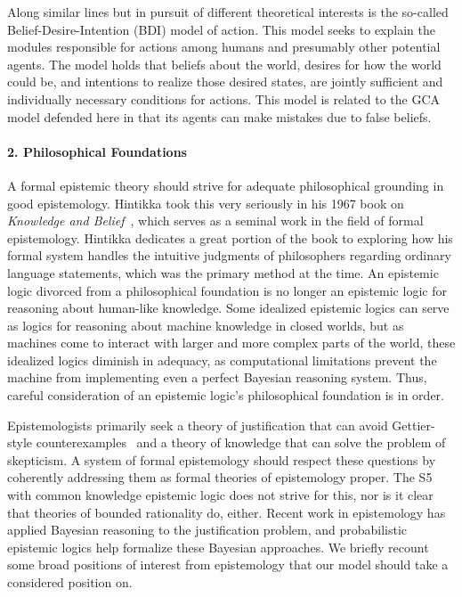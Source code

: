 Along similar lines but in pursuit of different theoretical interests is the so-called Belief-Desire-Intention (BDI) model of action. This model seeks to explain the modules responsible for actions among humans and presumably other potential agents. The model holds that beliefs about the world, desires for how the world could be, and intentions to realize those desired states, are jointly sufficient and individually necessary conditions for actions. This model is related to the GCA model defended here in that its agents can make mistakes due to false beliefs. 

\paragraph{2. Philosophical Foundations}
A formal epistemic theory should strive for adequate philosophical grounding in good epistemology. Hintikka took this very seriously in his 1967 book on \emph{Knowledge and Belief}~\cite{Hintikka}, which serves as a seminal work in the field of formal epistemology. Hintikka dedicates a great portion of the book to exploring how his formal system handles the intuitive judgments of philosophers regarding ordinary language statements, which was the primary method at the time. An epistemic logic divorced from a philosophical foundation is no longer an epistemic logic for reasoning about human-like knowledge. Some idealized epistemic logics can serve as logics for reasoning about machine knowledge in closed worlds, but as machines come to interact with larger and more complex parts of the world, these idealized logics diminish in adequacy, as computational limitations prevent the machine from implementing even a perfect Bayesian reasoning system. Thus, careful consideration of an epistemic logic's philosophical foundation is in order.

Epistemologists primarily seek a theory of justification that can avoid Gettier-style counterexamples~\cite{Gettier} and a theory of knowledge that can solve the problem of skepticism. A system of formal epistemology should respect these questions by coherently addressing them as formal theories of epistemology proper. The S5 with common knowledge epistemic logic does not strive for this, nor is it clear that theories of bounded rationality do, either. Recent work in epistemology has applied Bayesian reasoning to the justification problem, and probabilistic epistemic logics help formalize these Bayesian approaches. We briefly recount some broad positions of interest from epistemology that our model should take a considered position on.


